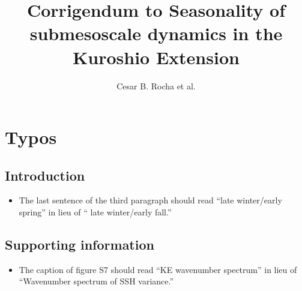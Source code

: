 \documentclass[11pt]{article}
\title{\bf \LARGE Corrigendum to Seasonality of submesoscale dynamics in the Kuroshio Extension}
\author{Cesar B. Rocha et al.}
\date{}
\newcommand{\sZ}{\mathsf{Z}}
\newcommand{\sE}{\mathsf{E}}
\begin{document}


\renewcommand{\sZ}{\mathsf{Z}}
\renewcommand{\sE}{\mathsf{E}}
\newcommand{\iBu}{\left(\tfrac{f_0}{N}\right)^2}
\newcommand{\F}{\mathcal{F}}
\newcommand{\D}{\mathcal{D}}
\renewcommand{\P}{\mathcal{P}}
\newcommand{\dU}{\delta U}
\newcommand{\W}{\mathcal{W}}
\newcommand{\cK}{\mathcal{K}}
\newcommand{\cP}{\mathcal{P}}
\renewcommand{\L}{\mathsf{L}}

%
%

\maketitle 

\section*{Typos}

\subsection*{Introduction}
    \begin{itemize}
        \item{The last sentence of the third paragraph should read ``late winter/early spring'' in lieu of ``              late winter/early fall.''}
    \end{itemize}
    
\subsection*{Supporting information}
    \begin{itemize}
        \item{The caption of figure S7 should read ``KE wavenumber spectrum'' in lieu of ``Wavenumber spectrum of SSH variance.''}
    \end{itemize}

%
%
%
%
\end{document}
